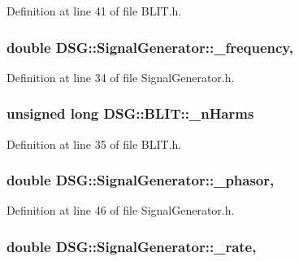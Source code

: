 Definition at line 41 of file B\+L\+I\+T.\+h.

\hypertarget{classDSG_1_1SignalGenerator_a67e296e3506dcdf09402c667cddff9ac}{
\subsubsection[{\+\_\+frequency}]{\setlength{\rightskip}{0pt plus 5cm}double D\+S\+G\+::\+Signal\+Generator\+::\+\_\+frequency\hspace{0.3cm}{\ttfamily [protected]}, {\ttfamily [inherited]}}}\label{classDSG_1_1SignalGenerator_a67e296e3506dcdf09402c667cddff9ac}


Definition at line 34 of file Signal\+Generator.\+h.

\hypertarget{classDSG_1_1BLIT_afe749d26f1503740bedd54f5147bc66d}{
\subsubsection[{\+\_\+n\+Harms}]{\setlength{\rightskip}{0pt plus 5cm}unsigned long D\+S\+G\+::\+B\+L\+I\+T\+::\+\_\+n\+Harms\hspace{0.3cm}{\ttfamily [protected]}}}\label{classDSG_1_1BLIT_afe749d26f1503740bedd54f5147bc66d}


Definition at line 35 of file B\+L\+I\+T.\+h.

\hypertarget{classDSG_1_1SignalGenerator_ac2271b582bf699275f077ecb642a8cd9}{
\subsubsection[{\+\_\+phasor}]{\setlength{\rightskip}{0pt plus 5cm}double D\+S\+G\+::\+Signal\+Generator\+::\+\_\+phasor\hspace{0.3cm}{\ttfamily [protected]}, {\ttfamily [inherited]}}}\label{classDSG_1_1SignalGenerator_ac2271b582bf699275f077ecb642a8cd9}


Definition at line 46 of file Signal\+Generator.\+h.

\hypertarget{classDSG_1_1SignalGenerator_aa10f6c85d9adee901139ea7fb346f39d}{
\subsubsection[{\+\_\+rate}]{\setlength{\rightskip}{0pt plus 5cm}double D\+S\+G\+::\+Signal\+Generator\+::\+\_\+rate\hspace{0.3cm}{\ttfamily [protected]}, {\ttfamily [inherited]}}}\label{classDSG_1_1SignalGenerator_aa10f6c85d9adee901139ea7fb346f39d}


